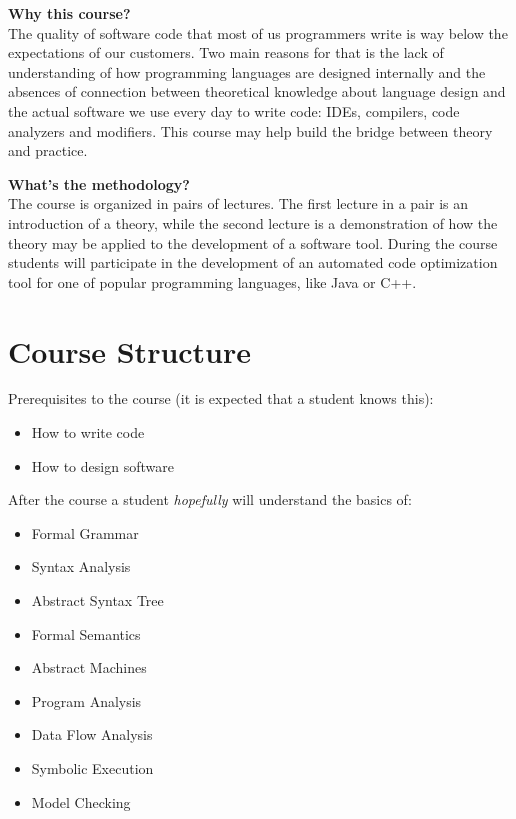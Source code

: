 \documentclass[nobrand,anonymous,nodate,nosecurity]{huawei}
\begin{document}
{\textbf{Why this course?}\\
The quality of software code that most of us programmers write is way below
the expectations of our customers. Two main reasons for that
is the lack of understanding of how programming languages are designed
internally and the absences of connection between theoretical knowledge
about language design and the actual software we use every day to
write code: IDEs, compilers, code analyzers and modifiers. This course
may help build the bridge between theory and practice.

\textbf{What's the methodology?}\\
The course is organized in pairs of lectures. The first lecture in a pair
is an introduction of a theory, while the second lecture is a demonstration
of how the theory may be applied to the development of a software tool. During
the course students will participate in the development of an automated
code optimization tool for one of popular programming languages, like Java or C++.

\newpage
\section*{Course Structure}

Prerequisites to the course (it is expected that a student knows this):

\begin{itemize}
\item How to write code
\item How to design software
\end{itemize}

After the course a student \emph{hopefully} will understand the basics of:

\begin{itemize}
\item Formal Grammar
\item Syntax Analysis
\item Abstract Syntax Tree
\item Formal Semantics
\item Abstract Machines
\item Program Analysis
\item Data Flow Analysis
\item Symbolic Execution
\item Model Checking
\end{itemize}

}
\end{document}
